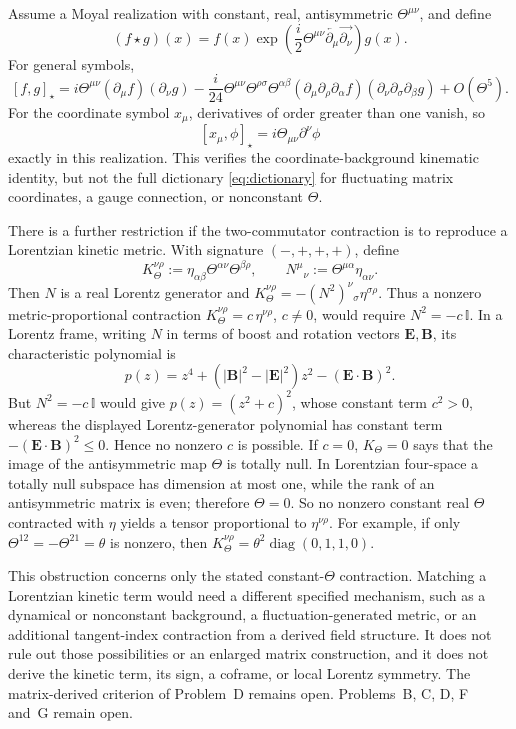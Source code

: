 \begin{remark}
  \label{rem:ch3-moyal-check}
Assume a Moyal realization with constant, real, antisymmetric
\(\Theta^{\mu\nu}\), and define
\[
  (f\star g)(x)
  =f(x)\exp\!\left(
    \frac{i}{2}\Theta^{\mu\nu}
    \overleftarrow{\partial_\mu}\overrightarrow{\partial_\nu}
  \right)g(x).
\]
For general symbols,
\[
  [f,g]_\star
  =i\Theta^{\mu\nu}(\partial_\mu f)(\partial_\nu g)
   -\frac{i}{24}\Theta^{\mu\nu}\Theta^{\rho\sigma}
      \Theta^{\alpha\beta}
      (\partial_\mu\partial_\rho\partial_\alpha f)
      (\partial_\nu\partial_\sigma\partial_\beta g)
   +O(\Theta^5).
\]
For the coordinate symbol \(x_\mu\), derivatives of order greater
than one vanish, so
\[
  [x_\mu,\phi]_\star
  =i\Theta_{\mu\nu}\partial^\nu\phi
\]
exactly in this realization. This verifies the coordinate-background
kinematic identity, but not the full dictionary
\eqref{eq:dictionary} for fluctuating matrix coordinates, a gauge
connection, or nonconstant \(\Theta\).

There is a further restriction if the two-commutator contraction is
to reproduce a Lorentzian kinetic metric. With signature
\((-,+,+,+)\), define
\[
  K_\Theta^{\nu\rho}
  :=\eta_{\alpha\beta}\Theta^{\alpha\nu}\Theta^{\beta\rho},
  \qquad
  N^\mu{}_\nu:=\Theta^{\mu\alpha}\eta_{\alpha\nu}.
\]
Then \(N\) is a real Lorentz generator and
\(K_\Theta^{\nu\rho}=-(N^2)^\nu{}_\sigma\eta^{\sigma\rho}\).
Thus a nonzero metric-proportional contraction
\(K_\Theta^{\nu\rho}=c\,\eta^{\nu\rho}\), \(c\ne0\), would require
\(N^2=-c\,\mathbb I\). In a Lorentz frame, writing \(N\) in terms of
boost and rotation vectors \(\mathbf E,\mathbf B\), its
characteristic polynomial is
\[
  p(z)=z^4+(|\mathbf B|^2-|\mathbf E|^2)z^2
             -(\mathbf E\cdot\mathbf B)^2 .
\]
But \(N^2=-c\,\mathbb I\) would give
\(p(z)=(z^2+c)^2\), whose constant term \(c^2>0\), whereas the
displayed Lorentz-generator polynomial has constant term
\(-(\mathbf E\cdot\mathbf B)^2\leq0\). Hence no nonzero \(c\) is
possible. If \(c=0\), \(K_\Theta=0\) says that the image of the
antisymmetric map \(\Theta\) is totally null. In Lorentzian
four-space a totally null subspace has dimension at most one, while
the rank of an antisymmetric matrix is even; therefore
\(\Theta=0\). So no nonzero constant real \(\Theta\) contracted with
\(\eta\) yields a tensor proportional to \(\eta^{\nu\rho}\).
For example, if only \(\Theta^{12}=-\Theta^{21}=\theta\) is nonzero,
then \(K_\Theta^{\nu\rho}=\theta^2
\operatorname{diag}(0,1,1,0)\).

This obstruction concerns only the stated constant-\(\Theta\)
contraction. Matching a Lorentzian kinetic term would need a
different specified mechanism, such as a dynamical or
nonconstant background, a fluctuation-generated metric, or an
additional tangent-index contraction from a derived field structure.
It does not rule out those possibilities or an enlarged matrix
construction, and it does not derive the kinetic term, its sign, a
coframe, or local Lorentz symmetry. The matrix-derived criterion of
Problem~D remains open. Problems~B, C, D, F and~G remain open.
\end{remark}

